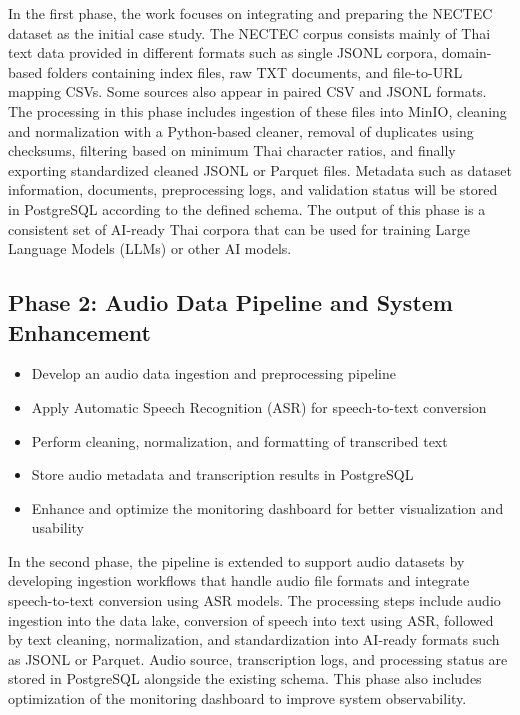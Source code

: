 \documentclass[12pt,oneside,openright,a4paper]{cpe-english-project}
\begin{document}
In the first phase, the work focuses on integrating and preparing the NECTEC dataset as the initial case study. The NECTEC corpus consists mainly of Thai text data provided in different formats such as single JSONL corpora, domain-based folders containing index files, raw TXT documents, and file-to-URL mapping CSVs. Some sources also appear in paired CSV and JSONL formats. The processing in this phase includes ingestion of these files into MinIO, cleaning and normalization with a Python-based cleaner, removal of duplicates using checksums, filtering based on minimum Thai character ratios, and finally exporting standardized cleaned JSONL or Parquet files. Metadata such as dataset information, documents, preprocessing logs, and validation status will be stored in PostgreSQL according to the defined schema. The output of this phase is a consistent set of AI-ready Thai corpora that can be used for training Large Language Models (LLMs) or other AI models.
\newpage
\subsection{Phase 2: Audio Data Pipeline and System Enhancement}
\begin{itemize}
\item Develop an audio data ingestion and preprocessing pipeline
\item Apply Automatic Speech Recognition (ASR) for speech-to-text conversion
\item Perform cleaning, normalization, and formatting of transcribed text
\item Store audio metadata and transcription results in PostgreSQL
\item Enhance and optimize the monitoring dashboard for better visualization and usability
\end{itemize}

In the second phase, the pipeline is extended to support audio datasets by developing ingestion workflows that handle audio file formats and integrate speech-to-text conversion using ASR models. The processing steps include audio ingestion into the data lake, conversion of speech into text using ASR, followed by text cleaning, normalization, and standardization into AI-ready formats such as JSONL or Parquet. Audio source, transcription logs, and processing status are stored in PostgreSQL alongside the existing schema. This phase also includes optimization of the monitoring dashboard to improve system observability.
\end{document}
